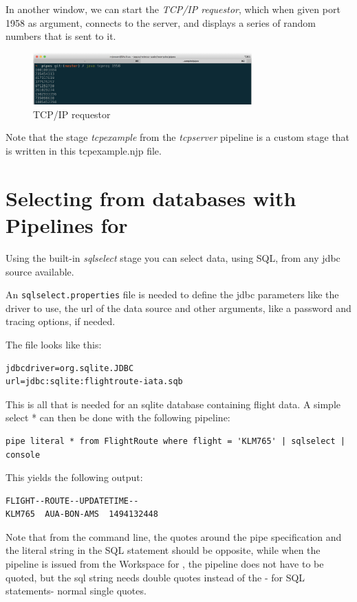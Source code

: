 In another window, we can start the \emph{TCP/IP requestor}, which
when given port 1958 as argument, connects to the server, and displays
a series of random numbers that is sent to it.

\begin{figure}[h]
  \includegraphics[width=0.75\textwidth]{images/tcpreq.png}
  \caption{TCP/IP requestor}
  \label{fig:tcpcompile}
\end{figure}

Note that the stage \emph{tcpexample} from the \emph{tcpserver}
pipeline is a custom stage that is written in this tcpexample.njp
file.

\chapter{Selecting from databases with Pipelines for \nr{}}

Using the built-in \emph{sqlselect} stage you can select data, using
SQL, from any jdbc source available.

An \texttt{sqlselect.properties} file is needed to define the jdbc parameters
like the driver to use, the url of the data source and other
arguments, like a password and tracing options, if needed.

The file looks like this:
\begin{verbatim}
jdbcdriver=org.sqlite.JDBC
url=jdbc:sqlite:flightroute-iata.sqb
\end{verbatim}

This is all that is needed for an sqlite database containing flight
data. A simple select * can then be done with the following pipeline:

\begin{lstlisting}
pipe literal * from FlightRoute where flight = 'KLM765' | sqlselect | console
\end{lstlisting}

This yields the following output:
\begin{verbatim}
FLIGHT--ROUTE--UPDATETIME--
KLM765  AUA-BON-AMS  1494132448
\end{verbatim}

\begin{shaded}
Note that from the command line, the quotes around the pipe
specification and the literal string in the SQL statement should be
opposite, while when the pipeline is issued from the Workspace for
\nr{}, the pipeline does not have to be quoted, but the sql string
needs double quotes instead of the - for SQL statements- normal single quotes.
\end{shaded}
